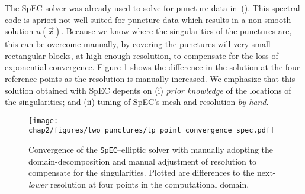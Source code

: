 The SpEC solver was already used to solve for puncture data
in~(\cite{dennison2006,lovelace2008}).  This spectral code is apriori
not well suited for puncture data which results in a non-smooth
solution $u(\vec x)$.  Because we know where the singularities of the
punctures are, this can be overcome manually, by covering the
punctures will very small rectangular blocks, at high enough
resolution, to compensate for the loss of exponential
convergence. Figure \ref{fig:spec_point_convergence} shows the
difference in the solution at the four reference points as the
resolution is manually increased. We emphasize that this
  solution obtained with SpEC depents on (i) \textit{prior knowledge}
  of the locations of the singularities; and (ii) tuning of SpEC's
  mesh and resolution \textit{by hand}.



  \begin{figure}[ht!]
    \centering
\texttt{[image: chap2/figures/two\_punctures/tp\_point\_convergence\_spec.pdf]}
\caption{
  \label{fig:spec_point_convergence}
  Convergence of the \texttt{SpEC}--elliptic solver with manually
  adopting the domain-decomposition and manual adjustment of
  resolution to compensate for the singularities. Plotted are differences to the
  next-\emph{lower} resolution at four points in the computational domain. }
\end{figure}


